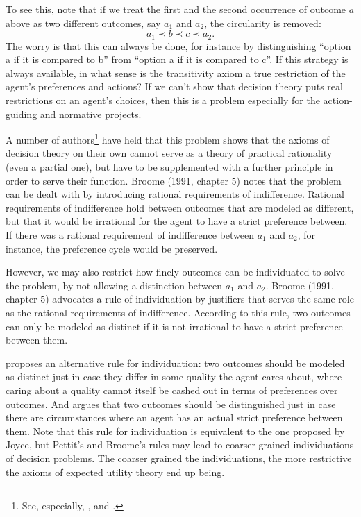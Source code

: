To see this, note that if we treat the first and the second occurrence of outcome $a$ above as two different outcomes, say $a_1$ and $a_2$, the circularity is removed:
$$a_1 \prec b \prec c \prec a_2.$$
The worry is that this can always be done, for instance by distinguishing ``option a if it is compared to b'' from ``option a if it is compared to c''. If this strategy is always available, in what sense is the transitivity axiom a true restriction of the agent's preferences and actions? If we can't show that decision theory puts real restrictions on an agent's choices, then this is a problem especially for the action-guiding and normative projects.

A number of authors\footnote{See, especially, \citet{Broome1991}, \citet{Pettit1991} and \citet{Dreier1996}.} have held that this problem shows that the axioms of decision theory on their own cannot serve as a theory of practical rationality (even a partial one), but have to be supplemented with a further principle in order to serve their function. Broome (1991, chapter 5) notes that the problem can be dealt with by introducing rational requirements of indifference. Rational requirements of indifference hold between outcomes that are modeled as different, but that it would be irrational for the agent to have a strict preference between. If there was a rational requirement of indifference between $a_1$ and $a_2$, for instance, the preference cycle would be preserved.

However, we may also restrict how finely outcomes can be individuated to solve the problem, by not allowing a distinction between $a_1$ and $a_2$. Broome (1991, chapter 5) advocates a rule of individuation by justifiers that serves the same role as the rational requirements of indifference. According to this rule, two outcomes can only be modeled as distinct if it is not irrational to have a strict preference between them.

\citet{Pettit1991} proposes an alternative rule for individuation: two outcomes should be modeled as distinct just in case they differ in some quality the agent cares about, where caring about a quality cannot itself be cashed out in terms of preferences over outcomes. And \citet{Dreier1996} argues that two outcomes should be distinguished just in case there are circumstances where an agent has an actual strict preference between them. Note that this rule for individuation is equivalent to the one proposed by Joyce, but Pettit's and Broome's rules may lead to coarser grained individuations of decision problems. The coarser grained the individuations, the more restrictive the axioms of expected utility theory end up being.

